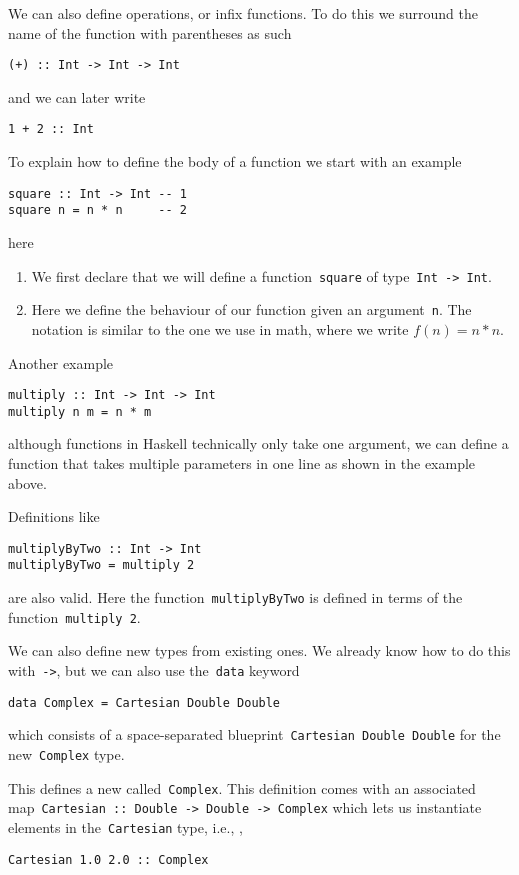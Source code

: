 \documentclass[a4paper]{article}
\theoremstyle{plain}
\theoremstyle{definition}
\newcommand{\ie}{{i}.{e}., }
\begin{document}
We can also define operations, or infix functions. To do this we surround the
name of the function with parentheses as such
\begin{verbatim}
(+) :: Int -> Int -> Int
\end{verbatim}
and we can later write
\begin{verbatim}
1 + 2 :: Int
\end{verbatim}

To explain how to define the body of a function we start with an example
\begin{verbatim}
square :: Int -> Int -- 1
square n = n * n     -- 2
\end{verbatim}
here
\begin{enumerate}
    \item We first declare that we will define a
        function~\texttt{square} of
        type~\texttt{Int -> Int}.
    \item Here we define the behaviour of our function given an
        argument~\texttt{n}. The notation is similar to the one
        we use in math, where we write \(f(n) = n*n\).
\end{enumerate}
Another example
\begin{verbatim}
multiply :: Int -> Int -> Int
multiply n m = n * m
\end{verbatim}
although functions in Haskell technically only take one argument, we can define
a function that takes multiple parameters in one line as shown in the example
above.

Definitions like
\begin{verbatim}
multiplyByTwo :: Int -> Int
multiplyByTwo = multiply 2
\end{verbatim}
are also valid. Here the function~\texttt{multiplyByTwo} is defined
in terms of the function~\texttt{multiply 2}.

We can also define new types from existing ones. We already know how to do this
with~\texttt{->}, but we can also use
the~\texttt{data} keyword
\begin{verbatim}
data Complex = Cartesian Double Double
\end{verbatim}
which consists of a space-separated blueprint~\texttt{Cartesian
Double Double} for the new~\texttt{Complex} type.

This defines a new called~\texttt{Complex}. This definition comes
with an associated
map~\texttt{Cartesian :: Double -> Double -> Complex} which lets us
instantiate elements in the~\texttt{Cartesian} type, \ie,
\begin{verbatim}
Cartesian 1.0 2.0 :: Complex
\end{verbatim}
\end{document}
